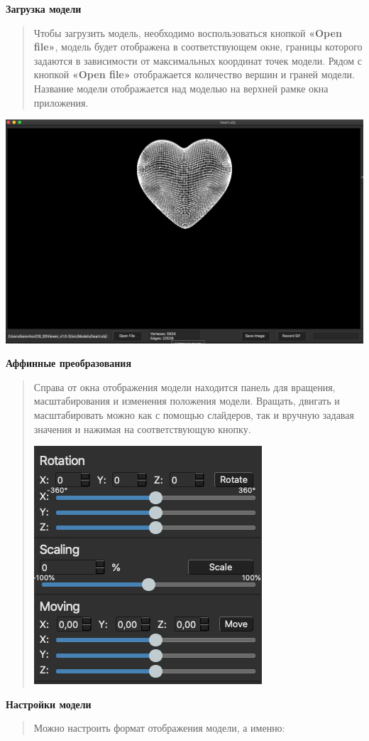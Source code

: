 \documentclass[
]{article}
\begin{document}
\huge
\textbf{Загрузка модели}
\newline
\LARGE
\begin{quote}
Чтобы загрузить модель, необходимо воспользоваться кнопкой \textbf{«Open
file»}, модель будет отображена в соответствующем окне, границы которого
задаются в зависимости от максимальных координат точек модели. Рядом с
кнопкой \textbf{«Open file»} отображается количество вершин и граней
модели. Название модели отображается над моделью на верхней рамке окна
приложения.
\end{quote}
\includegraphics[bb=0 0 1000 650]{media/image2.png}
\pagebreak[25]

\huge
\textbf{Аффинные преобразования}
\newline
\LARGE
\begin{quote}
Справа от окна отображения модели находится панель для вращения,
масштабирования и изменения положения модели. Вращать, двигать и
масштабировать можно как с помощью слайдеров, так и вручную задавая
значения и нажимая на соответствующую кнопку.
\begin{center}
\includegraphics[bb=0 0 380 260]{media/image3.png}
\end{center}
\end{quote}
\pagebreak[30]
\huge
\textbf{Настройки модели}
\newline
\LARGE
\begin{quote}
Можно настроить формат отображения модели, а именно:
\end{quote}
\end{document}
